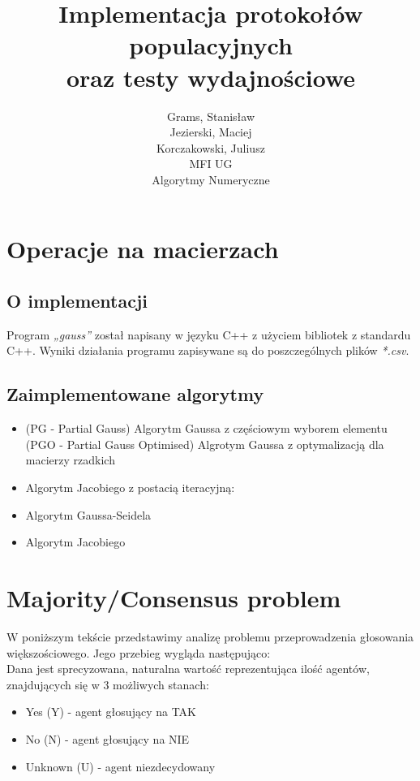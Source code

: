 \documentclass[10pt]{article}
\begin{document}
\title{Implementacja protokołów populacyjnych\\oraz testy wydajnościowe}
\author{Grams, Stanisław\\Jezierski, Maciej\\Korczakowski, Juliusz\\ MFI UG\\Algorytmy Numeryczne}

\maketitle
\section {Operacje na macierzach}
\subsection{O implementacji}
Program \textit{„gauss”} został napisany w języku C++ z użyciem bibliotek z standardu C++. 
Wyniki działania programu zapisywane są do poszczególnych plików \textit{*.csv}.
\subsection{Zaimplementowane algorytmy}
\begin{itemize}
	\item (PG - Partial Gauss) Algorytm Gaussa z częściowym wyborem elementu
	\Item (PGO - Partial Gauss Optimised) Algrotym Gaussa z optymalizacją dla macierzy rzadkich
	\item Algorytm Jacobiego z postacią iteracyjną:
	\item Algorytm Gaussa-Seidela
	\item Algorytm Jacobiego
\end{itemize}

\section{Majority/Consensus problem}
W poniższym tekście przedstawimy analizę problemu przeprowadzenia głosowania większościowego. Jego przebieg wygląda następująco:\\
Dana jest sprecyzowana, naturalna wartość reprezentująca ilość agentów, znajdujących się w 3 możliwych stanach:\\
\begin{itemize}
    \item Yes (Y) - agent głosujący na TAK
    \item No (N) - agent głosujący na NIE
    \item Unknown (U) - agent niezdecydowany
\end{itemize}
\end{document}
